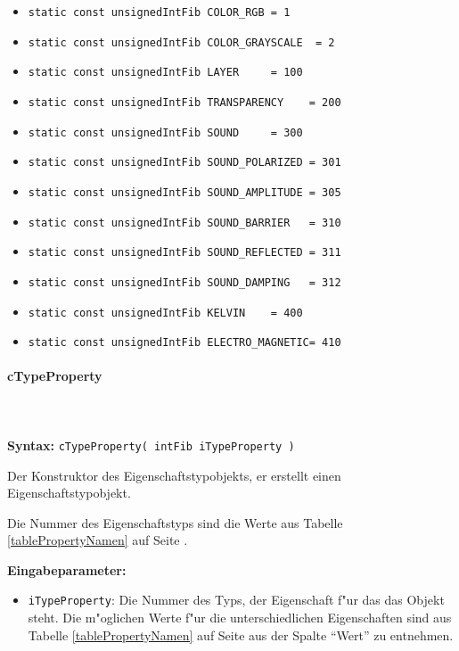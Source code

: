 \begin{itemize}
 \item \verb|static const unsignedIntFib COLOR_RGB = 1|
 \item \verb|static const unsignedIntFib COLOR_GRAYSCALE  = 2|
 \item \verb|static const unsignedIntFib LAYER     = 100|
 \item \verb|static const unsignedIntFib TRANSPARENCY    = 200|
 \item \verb|static const unsignedIntFib SOUND     = 300|
 \item \verb|static const unsignedIntFib SOUND_POLARIZED = 301|
 \item \verb|static const unsignedIntFib SOUND_AMPLITUDE = 305|
 \item \verb|static const unsignedIntFib SOUND_BARRIER   = 310|
 \item \verb|static const unsignedIntFib SOUND_REFLECTED = 311|
 \item \verb|static const unsignedIntFib SOUND_DAMPING   = 312|
 \item \verb|static const unsignedIntFib KELVIN    = 400|
 \item \verb|static const unsignedIntFib ELECTRO_MAGNETIC= 410|
\end{itemize}


\paragraph{cTypeProperty}

\ \\\\\noindent
\textbf{Syntax:} \verb|cTypeProperty( intFib iTypeProperty )|

\bigskip\noindent
Der Konstruktor des Eigenschaftstypobjekts, er erstellt einen Eigenschaftstypobjekt.

Die Nummer des Eigenschaftstyps sind die Werte aus Tabelle \ref{tablePropertyNamen} auf Seite \pageref{tablePropertyNamen} .

\bigskip\noindent
\textbf{Eingabeparameter:}
\begin{itemize}
 \item \verb|iTypeProperty|: Die Nummer des Typs, der Eigenschaft f"ur das das Objekt steht. Die m"oglichen Werte f"ur die unterschiedlichen Eigenschaften sind aus Tabelle \ref{tablePropertyNamen} auf Seite \pageref{tablePropertyNamen} aus der Spalte ``Wert'' zu entnehmen.
\end{itemize}


